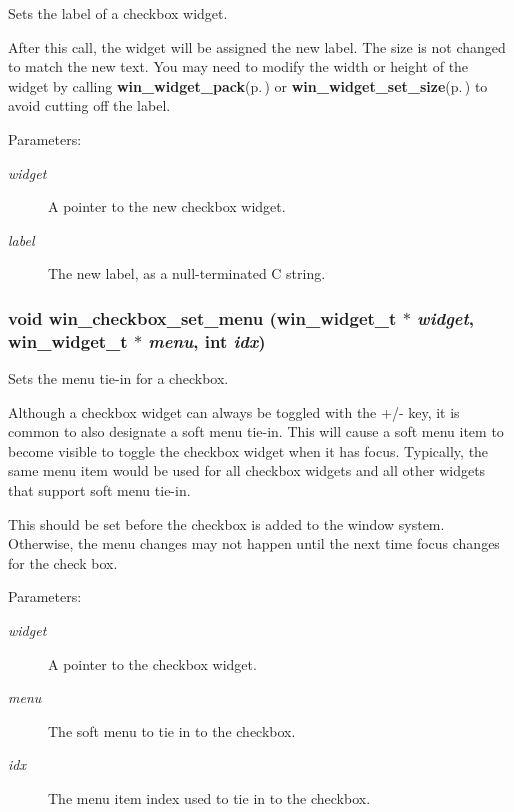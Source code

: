 Sets the label of a checkbox widget. 

After this call, the widget will be assigned the new label. The size is not changed to match the new text. You may need to modify the width or height of the widget by calling {\bf win\_\-widget\_\-pack}{\rm (p.\,\pageref{winwidget_8h_a12})} or {\bf win\_\-widget\_\-set\_\-size}{\rm (p.\,\pageref{winwidget_8h_a10})} to avoid cutting off the label.

\begin{Desc}
\item[Parameters:]
\begin{description}
\item[{\em widget}]A pointer to the new checkbox widget. \item[{\em label}]The new label, as a null-terminated C string. \end{description}
\end{Desc}
\subsubsection{\setlength{\rightskip}{0pt plus 5cm}void win\_\-checkbox\_\-set\_\-menu ({\bf win\_\-widget\_\-t} $\ast$ {\em widget}, {\bf win\_\-widget\_\-t} $\ast$ {\em menu}, int {\em idx})}\label{wincheckbox_8h_a5}


Sets the menu tie-in for a checkbox. 

Although a checkbox widget can always be toggled with the +/- key, it is common to also designate a soft menu tie-in. This will cause a soft menu item to become visible to toggle the checkbox widget when it has focus. Typically, the same menu item would be used for all checkbox widgets and all other widgets that support soft menu tie-in.

This should be set before the checkbox is added to the window system. Otherwise, the menu changes may not happen until the next time focus changes for the check box.

\begin{Desc}
\item[Parameters:]
\begin{description}
\item[{\em widget}]A pointer to the checkbox widget. \item[{\em menu}]The soft menu to tie in to the checkbox. \item[{\em idx}]The menu item index used to tie in to the checkbox. \end{description}
\end{Desc}
